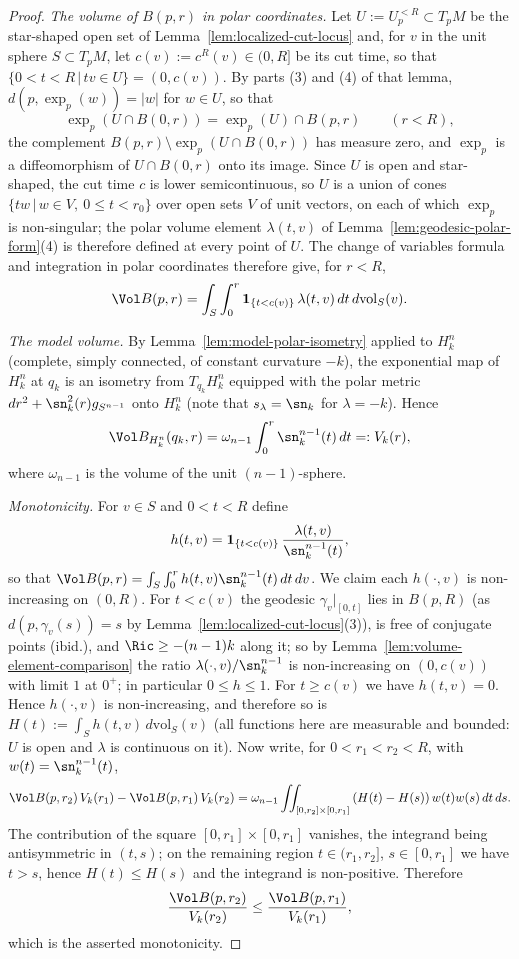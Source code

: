 \begin{proof}
\emph{The volume of $B(p,r)$ in polar coordinates.} Let
$U:=U_p^{<R}\subset T_pM$ be the star-shaped open set of
Lemma~\ref{lem:localized-cut-locus} and, for $v$ in the unit sphere
$S\subset T_pM$, let $c(v):=c^R(v)\in(0,R]$ be its cut time, so
that $\{0<t<R\,|\,tv\in U\}=(0,c(v))$. By parts (3) and (4) of that
lemma, $d(p,\exp_p(w))=|w|$ for $w\in U$, so that
$$\exp_p\left(U\cap B(0,r)\right)
=\exp_p(U)\cap B(p,r)\qquad(r<R),$$
the complement $B(p,r)\setminus\exp_p(U\cap B(0,r))$ has
measure zero, and $\exp_p$ is a diffeomorphism of $U\cap
B(0,r)$ onto its image. Since $U$ is open and star-shaped, the cut
time $c$ is lower semicontinuous, so $U$ is a union of cones
$\{tw\,|\,w\in V,\ 0\le t<r_0\}$ over open sets $V$ of unit
vectors, on each of which $\exp_p$ is non-singular; the polar
volume element $\lambda(t,v)$ of
Lemma~\ref{lem:geodesic-polar-form}(4) is therefore defined at
every point of $U$. The change of variables formula and
integration in polar coordinates therefore give,
for $r<R$,
$$\Vol B(p,r)=\int_{S}\int_0^r
\mathbf{1}_{\{t<c(v)\}}\,\lambda(t,v)\,dt\,d\mathrm{vol}_{S}(v).$$

\emph{The model volume.} By
Lemma~\ref{lem:model-polar-isometry} applied to $H^n_k$ (complete,
simply connected, of constant curvature $-k$), the exponential map
of $H^n_k$ at $q_k$ is an isometry from $T_{q_k}H^n_k$ equipped
with the polar metric $dr^2+\sn_k^2(r)g_{S^{n-1}}$ onto $H^n_k$
(note that $s_{\lambda}=\sn_k$ for $\lambda=-k$). Hence
$$\Vol B_{H^n_k}(q_k,r)=\omega_{n-1}\int_0^r\sn_k^{n-1}(t)\,dt
=:V_k(r),$$
where $\omega_{n-1}$ is the volume of the unit $(n-1)$-sphere.

\emph{Monotonicity.} For $v\in S$ and $0<t<R$ define
$$h(t,v)=\mathbf{1}_{\{t<c(v)\}}\,
\frac{\lambda(t,v)}{\sn_k^{n-1}(t)},$$
so that $\Vol B(p,r)=\int_S\int_0^rh(t,v)\sn_k^{n-1}(t)\,dt\,dv$.
We claim each $h(\cdot,v)$ is non-increasing on $(0,R)$. For
$t<c(v)$ the geodesic $\gamma_v|_{[0,t]}$ lies in $B(p,R)$
(as $d(p,\gamma_v(s))=s$ by
Lemma~\ref{lem:localized-cut-locus}(3)), is free of conjugate
points (ibid.), and $\Ric\ge-(n-1)k$ along it; so by
Lemma~\ref{lem:volume-element-comparison} the ratio
$\lambda(\cdot,v)/\sn_k^{n-1}$ is non-increasing on
$(0,c(v))$ with limit $1$ at $0^+$; in particular $0\le
h\le1$. For $t\ge c(v)$ we have $h(t,v)=0$. Hence $h(\cdot,v)$ is
non-increasing, and therefore so is
$H(t):=\int_Sh(t,v)\,d\mathrm{vol}_S(v)$ (all functions here are
measurable and bounded: $U$ is open and $\lambda$ is continuous
on it). Now write, for $0<r_1<r_2<R$, with
$w(t)=\sn_k^{n-1}(t)$,
$$\Vol B(p,r_2)\,V_k(r_1)-\Vol B(p,r_1)\,V_k(r_2)
=\omega_{n-1}\iint_{[0,r_2]\times[0,r_1]}
\left(H(t)-H(s)\right)w(t)w(s)\,dt\,ds.$$
The contribution of the square $[0,r_1]\times[0,r_1]$ vanishes,
the integrand being antisymmetric in $(t,s)$; on the remaining
region $t\in(r_1,r_2]$, $s\in[0,r_1]$ we have $t>s$, hence
$H(t)\le H(s)$ and the integrand is non-positive. Therefore
$$\frac{\Vol B(p,r_2)}{V_k(r_2)}\le\frac{\Vol B(p,r_1)}{V_k(r_1)},$$
which is the asserted monotonicity.


\end{proof}
